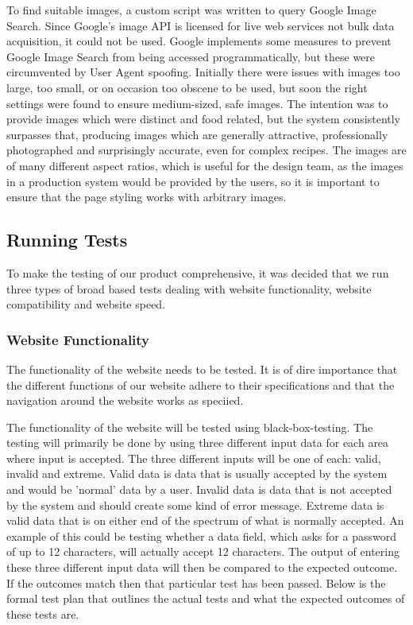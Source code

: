 To find suitable images, a custom script was written to query Google Image Search. Since Google's image API is licensed for live web services not bulk data acquisition, it could not be used. Google implements some measures to prevent Google Image Search from being accessed programmatically, but these were circumvented by User Agent spoofing. Initially there were issues with images too large, too small, or on occasion too obscene to be used, but soon the right settings were found to ensure medium-sized, safe images. The intention was to provide images which were distinct and food related, but the system consistently surpasses that, producing images which are generally attractive, professionally photographed and surprisingly accurate, even for complex recipes. The images are of many different aspect ratios, which is useful for the design team, as the images in a production system would be provided by the users, so it is important to ensure that the page styling works with arbitrary images.



\subsection{Running Tests}                                      %
To make the testing of our product comprehensive, it was decided that we run three types of broad based tests dealing with website functionality, website compatibility and website speed. 

\subsubsection{Website Functionality}
The functionality of the website needs to be tested. It is of dire importance that the different functions of our website adhere to their specifications and that the navigation around the website works as speciied. 

The functionality of the website will be tested using black-box-testing. The testing will primarily be done by using three different input data for each area where input is accepted. The three different inputs will be one of each: valid, invalid and extreme.
Valid data is data that is usually accepted by the system and would be 'normal' data by a user. Invalid data is data that is not accepted by the system and should create some kind of error message. Extreme data is valid data that is on either end of the spectrum of what is normally accepted. An example of this could be testing whether a data field, which asks for a password of up to 12 characters, will actually accept 12 characters. The output of entering these three different input data will then be compared to the expected outcome. If the outcomes match then that particular test has been passed. Below is the formal test plan that outlines the actual tests and what the expected outcomes of these tests are.
 
